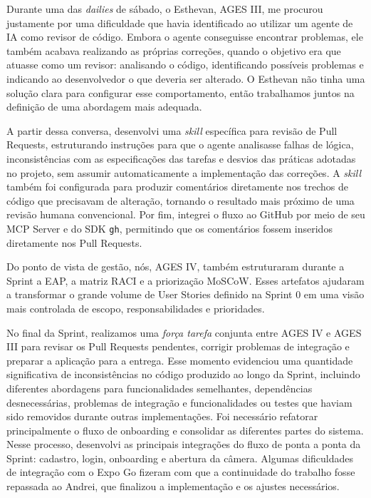 \indent Durante uma das \textit{dailies} de sábado, o Esthevan, AGES III, me procurou justamente por uma dificuldade que havia identificado ao utilizar um agente de IA como revisor de código. Embora o agente conseguisse encontrar problemas, ele também acabava realizando as próprias correções, quando o objetivo era que atuasse como um revisor: analisando o código, identificando possíveis problemas e indicando ao desenvolvedor o que deveria ser alterado. O Esthevan não tinha uma solução clara para configurar esse comportamento, então trabalhamos juntos na definição de uma abordagem mais adequada.\par

\indent A partir dessa conversa, desenvolvi uma \textit{skill} específica para revisão de Pull Requests, estruturando instruções para que o agente analisasse falhas de lógica, inconsistências com as especificações das tarefas e desvios das práticas adotadas no projeto, sem assumir automaticamente a implementação das correções. A \textit{skill} também foi configurada para produzir comentários diretamente nos trechos de código que precisavam de alteração, tornando o resultado mais próximo de uma revisão humana convencional. Por fim, integrei o fluxo ao GitHub por meio de seu MCP Server e do SDK \texttt{gh}, permitindo que os comentários fossem inseridos diretamente nos Pull Requests.\originalspace{}\par

\indent Do ponto de vista de gestão, nós, AGES IV, também estruturaram durante a Sprint a EAP, a matriz RACI e a priorização MoSCoW. Esses artefatos ajudaram a transformar o grande volume de User Stories definido na Sprint 0 em uma visão mais controlada de escopo, responsabilidades e prioridades.\par

\indent No final da Sprint, realizamos uma \textit{\textup{força tarefa}} conjunta entre AGES IV e AGES III para revisar os Pull Requests pendentes, corrigir problemas de integração e preparar a aplicação para a entrega. Esse momento evidenciou uma quantidade significativa de inconsistências no código produzido ao longo da Sprint, incluindo diferentes abordagens para funcionalidades semelhantes, dependências desnecessárias, problemas de integração e funcionalidades ou testes que haviam sido removidos durante outras implementações. Foi necessário refatorar principalmente o fluxo de onboarding e consolidar as diferentes partes do sistema. Nesse processo, desenvolvi as principais integrações do fluxo de ponta a ponta da Sprint: cadastro, login, onboarding e abertura da câmera. Algumas dificuldades de integração com o Expo Go fizeram com que a continuidade do trabalho fosse repassada ao Andrei, que finalizou a implementação e os ajustes necessários.\par


